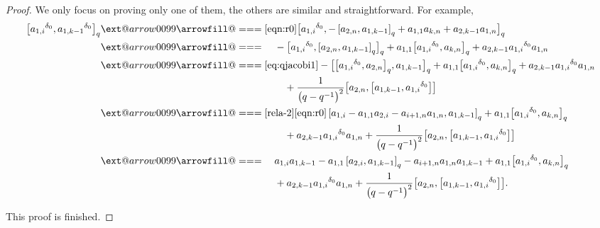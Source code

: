 \documentclass[10pt,a4paper]{amsart}
\makeatletter
\def\x@arrow{\DOTSB\Relbar}
\def\xlongequalsignfill@{\arrowfill@\x@arrow\Relbar\x@arrow}
\providecommand{\xlongequal}[2][]{%
	\ext@arrow 0099\xlongequalsignfill@{#1}{#2}}
\numberwithin{equation}{section}
\def\lr#1{\left[#1\right]}
\def\d{\delta}
\makeatother
\begin{document}
\begin{proof}
We only focus on proving only one of them, the others are similar and straightforward.
For example,
\begin{align*}
\bigl[{a_{1,i}}^{\d_0},{a_{1,k-1}}^{\d_0}\bigr]_q&
\xlongequal{\eqref{eqn:r0}}\bigl[{a_{1,i}}^{\d_0},-\lr{a_{2,n},a_{1,k-1}}_q+a_{1,1}a_{k,n}+a_{2,k-1}a_{1,n}\bigr]_q\\
&\xlongequal{\quad}-\bigl[{a_{1,i}}^{\d_0},\lr{a_{2,n},a_{1,k-1}}_q\bigr]_q +a_{1,1}\bigl[{a_{1,i}}^{\d_0},a_{k,n}\bigr]_q +a_{2,k-1}{a_{1,i}}^{\d_0}a_{1,n}\\
&\xlongequal{\eqref{eq:qjacobi1}}-\bigl[\bigl[{a_{1,i}}^{\d_0},a_{2,n}\bigr]_q,a_{1,k-1}\bigr]_q+a_{1,1}\bigl[{a_{1,i}}^{\d_0},a_{k,n}\bigr]_q
+a_{2,k-1}{a_{1,i}}^{\d_0}a_{1,n}\\
&\phantom{\xlongequal{\qquad}}{}+\frac{1}{\bigl(q-q^{-1}\bigr)^2}\bigl[a_{2,n}, \bigl[a_{1,k-1}, {a_{1,i}}^{\d_0}\bigr]\bigr]\\
&\xlongequal[\eqref{rela-2}]{\eqref{eqn:r0}}\lr{a_{1,i}-a_{1,1}a_{2,i}-a_{i+1,n}a_{1,n},a_{1,k-1}}_q+a_{1,1}\bigl[{a_{1,i}}^{\d_0},a_{k,n}\bigr]_q \\
&\phantom{\xlongequal{\qquad}}{}+a_{2,k-1}{a_{1,i}}^{\d_0}a_{1,n}+\frac{1}{\bigl(q-q^{-1}\bigr)^2}\bigl[a_{2,n}, \bigl[a_{1,k-1}, {a_{1,i}}^{\d_0}\bigr] \bigr]\\
&\xlongequal{\quad }a_{1,i}a_{1,k-1}-a_{1,1}\lr{a_{2,i},a_{1,k-1}}_q-a_{i+1,n}a_{1,n}a_{1,k-1} +a_{1,1}\bigl[{a_{1,i}}^{\d_0},a_{k,n}\bigr]_q\\
&\phantom{\xlongequal{\quad }}{}+a_{2,k-1}{a_{1,i}}^{\d_0}a_{1,n}+\frac{1}{\bigl(q-q^{-1}\bigr)^2}\bigl[a_{2,n}, \bigl[a_{1,k-1}, {a_{1,i}}^{\d_0}\bigr]\bigr].
\end{align*}

This proof is finished.
\end{proof}
\end{document}
